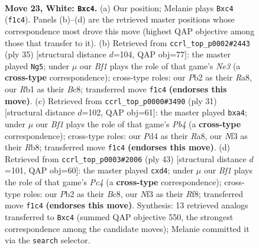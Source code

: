\documentclass[11pt]{article}
\begin{document}
\clearpage

\begin{figure}[p]\centering
\begin{subfigure}{0.46\textwidth}\centering
\resizebox{\linewidth}{!}{%
\newchessgame
\chessboard[
  setfen={rn2r1k1/2pnq1pp/1p2p3/p2pPp2/2bP1P1P/P4NNQ/1PPK2P1/1R3B1R w - - 7 23},
  showmover=false,
  pgfstyle=straightmove, color=movearrow, markmove={f1-c4}
]}
\caption{}
\end{subfigure}\hfill
\begin{subfigure}{0.46\textwidth}\centering
\resizebox{\linewidth}{!}{%
\newchessgame
\chessboard[
  setfen={r1b1r1k1/1pq2pp1/2ppnn1p/p3p3/P2PP3/NQP1RN1P/1P3PP1/4RBK1 b - - 2 18},
  showmover=false,
  pgfstyle=straightmove, color=movearrow, markmove={e6-g5}
]}
\caption{}
\end{subfigure}
\\[4pt]
\begin{subfigure}{0.46\textwidth}\centering
\resizebox{\linewidth}{!}{%
\newchessgame
\chessboard[
  setfen={rr4k1/2pqb1p1/p2ppn1p/1p6/Pn1PP3/4BN1P/1P2QPP1/RN2R1K1 b - - 2 16},
  showmover=false,
  pgfstyle=straightmove, color=movearrow, markmove={b5-a4}
]}
\caption{}
\end{subfigure}\hfill
\begin{subfigure}{0.46\textwidth}\centering
\resizebox{\linewidth}{!}{%
\newchessgame
\chessboard[
  setfen={2b2r1k/3nnqp1/1p1b3p/2pp4/P2Pp3/2P4P/1P2QPPN/R1B1RN1K b - - 1 22},
  showmover=false,
  pgfstyle=straightmove, color=movearrow, markmove={c5-d4}
]}
\caption{}
\end{subfigure}
\caption{\textbf{Move 23, White: \texttt{Bxc4}.} (a) Our position; Melanie plays \texttt{Bxc4} (\texttt{f1c4}). Panels (b)--(d) are the retrieved master positions whose correspondence most drove this move (highest QAP objective among those that transfer to it). (b) Retrieved from \texttt{ccrl\_top\_p0002\#2443} (ply 35) [structural distance $d$=104, QAP obj=77]: the master played \texttt{Ng5}; under $\mu$ our \emph{Bf1} plays the role of that game's \emph{Ne3} (a \textbf{cross-type} correspondence); cross-type roles: our \emph{P}b2 as their \emph{R}a8, our \emph{R}b1 as their \emph{B}c8; transferred move \texttt{f1c4} \textbf{(endorses this move)}. (c) Retrieved from \texttt{ccrl\_top\_p0000\#3490} (ply 31) [structural distance $d$=102, QAP obj=61]: the master played \texttt{bxa4}; under $\mu$ our \emph{Bf1} plays the role of that game's \emph{Pb4} (a \textbf{cross-type} correspondence); cross-type roles: our \emph{P}d4 as their \emph{R}a8, our \emph{N}f3 as their \emph{R}b8; transferred move \texttt{f1c4} \textbf{(endorses this move)}. (d) Retrieved from \texttt{ccrl\_top\_p0003\#2006} (ply 43) [structural distance $d$=101, QAP obj=60]: the master played \texttt{cxd4}; under $\mu$ our \emph{Bf1} plays the role of that game's \emph{Pc4} (a \textbf{cross-type} correspondence); cross-type roles: our \emph{P}b2 as their \emph{B}c8, our \emph{N}f3 as their \emph{R}f8; transferred move \texttt{f1c4} \textbf{(endorses this move)}. Synthesis: 13 retrieved analogs transferred to \texttt{Bxc4} (summed QAP objective 550, the strongest correspondence among the candidate moves); Melanie committed it via the \texttt{search} selector.}

\end{figure}
\end{document}
